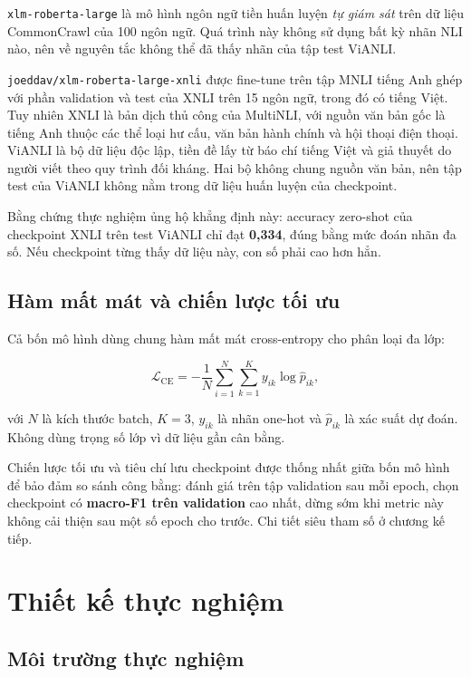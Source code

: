 \documentclass[12pt,a4paper,oneside]{report}
\begin{document}
\texttt{xlm-roberta-large} là mô hình ngôn ngữ tiền huấn luyện \textit{tự giám sát} trên
dữ liệu CommonCrawl của 100 ngôn ngữ. Quá trình này không sử dụng bất kỳ nhãn NLI nào, nên
về nguyên tắc không thể đã thấy nhãn của tập test ViANLI.

\texttt{joeddav/xlm-roberta-large-xnli} được fine-tune trên tập MNLI tiếng Anh ghép với
phần validation và test của XNLI trên 15 ngôn ngữ, trong đó có tiếng Việt. Tuy nhiên XNLI
là bản dịch thủ công của MultiNLI, với nguồn văn bản gốc là tiếng Anh thuộc các thể loại
hư cấu, văn bản hành chính và hội thoại điện thoại. ViANLI là bộ dữ liệu độc lập, tiền đề
lấy từ báo chí tiếng Việt và giả thuyết do người viết theo quy trình đối kháng. Hai bộ
không chung nguồn văn bản, nên tập test của ViANLI không nằm trong dữ liệu huấn luyện của
checkpoint.

Bằng chứng thực nghiệm ủng hộ khẳng định này: accuracy zero-shot của checkpoint XNLI trên
test ViANLI chỉ đạt \textbf{0,334}, đúng bằng mức đoán nhãn đa số. Nếu checkpoint từng
thấy dữ liệu này, con số phải cao hơn hẳn.

\section{Hàm mất mát và chiến lược tối ưu}

Cả bốn mô hình dùng chung hàm mất mát cross-entropy cho phân loại đa lớp:

\begin{equation}
  \mathcal{L}_{\mathrm{CE}}=-\frac{1}{N}\sum_{i=1}^{N}\sum_{k=1}^{K}
  y_{ik}\log \hat{p}_{ik},
\end{equation}

với $N$ là kích thước batch, $K = 3$, $y_{ik}$ là nhãn one-hot và $\hat{p}_{ik}$ là xác
suất dự đoán. Không dùng trọng số lớp vì dữ liệu gần cân bằng.

Chiến lược tối ưu và tiêu chí lưu checkpoint được thống nhất giữa bốn mô hình để bảo đảm
so sánh công bằng: đánh giá trên tập validation sau mỗi epoch, chọn checkpoint có
\textbf{macro-F1 trên validation} cao nhất, dừng sớm khi metric này không cải thiện sau
một số epoch cho trước. Chi tiết siêu tham số ở chương kế tiếp.

\chapter{Thiết kế thực nghiệm}

\section{Môi trường thực nghiệm}
\end{document}
